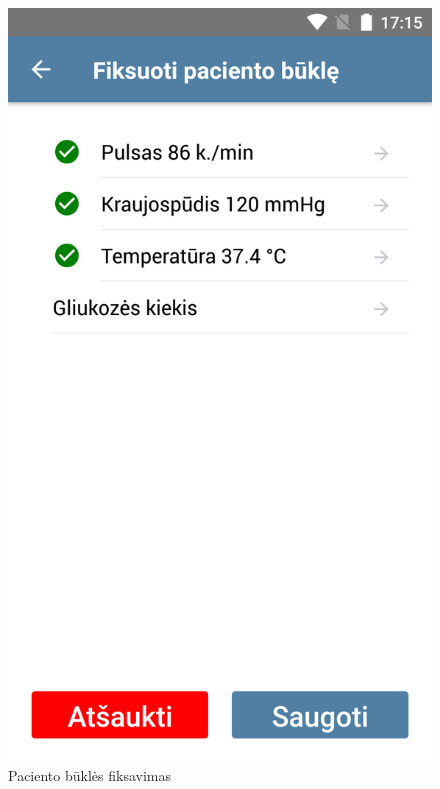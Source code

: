 \documentclass{VUMIFPSbakalaurinis}
\begin{document}
\begin{figure}[H]
    \centering
    \includegraphics[scale=0.15]{images/prototype-6}
    \caption{Paciento būklės fiksavimas} 
\end{figure}
\end{document}
